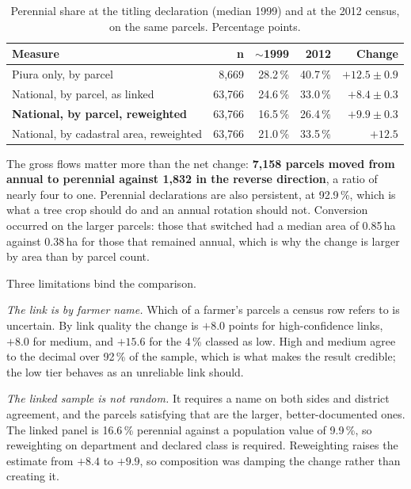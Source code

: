 \documentclass[11pt,a4paper]{article}
\begin{document}
\begin{table}[htbp]
\centering
\small
\caption{Perennial share at the titling declaration (median 1999) and at the 2012 census, on the
same parcels. Percentage points.}
\label{tab:census}
\begin{tabular}{@{}lrrrr@{}}
\toprule
\textbf{Measure} & \textbf{n} & \textbf{$\sim$1999} & \textbf{2012} & \textbf{Change} \\
\midrule
Piura only, by parcel & 8{,}669 & 28.2\,\% & 40.7\,\% & $+12.5 \pm 0.9$ \\
National, by parcel, as linked & 63{,}766 & 24.6\,\% & 33.0\,\% & $+8.4 \pm 0.3$ \\
\textbf{National, by parcel, reweighted} & 63{,}766 & 16.5\,\% & 26.4\,\% & $\mathbf{+9.9 \pm 0.3}$ \\
National, by cadastral area, reweighted & 63{,}766 & 21.0\,\% & 33.5\,\% & $+12.5$ \\
\bottomrule
\end{tabular}
\end{table}

The gross flows matter more than the net change: \textbf{7{,}158 parcels moved from annual to
perennial against 1{,}832 in the reverse direction}, a ratio of nearly four to one. Perennial
declarations are also persistent, at 92.9\,\%, which is what a tree crop should do and an annual
rotation should not. Conversion occurred on the larger parcels: those that switched had a median
area of 0.85\,ha against 0.38\,ha for those that remained annual, which is why the change is
larger by area than by parcel count.

Three limitations bind the comparison.

\emph{The link is by farmer name.} Which of a farmer's parcels a census row refers to is
uncertain. By link quality the change is $+8.0$ points for high-confidence links, $+8.0$ for
medium, and $+15.6$ for the 4\,\% classed as low. High and medium agree to the decimal over
92\,\% of the sample, which is what makes the result credible; the low tier behaves as an
unreliable link should.

\emph{The linked sample is not random.} It requires a name on both sides and district agreement,
and the parcels satisfying that are the larger, better-documented ones. The linked panel is
16.6\,\% perennial against a population value of 9.9\,\%, so reweighting on department and
declared class is required. Reweighting raises the estimate from $+8.4$ to $+9.9$, so composition
was damping the change rather than creating it.
\end{document}
